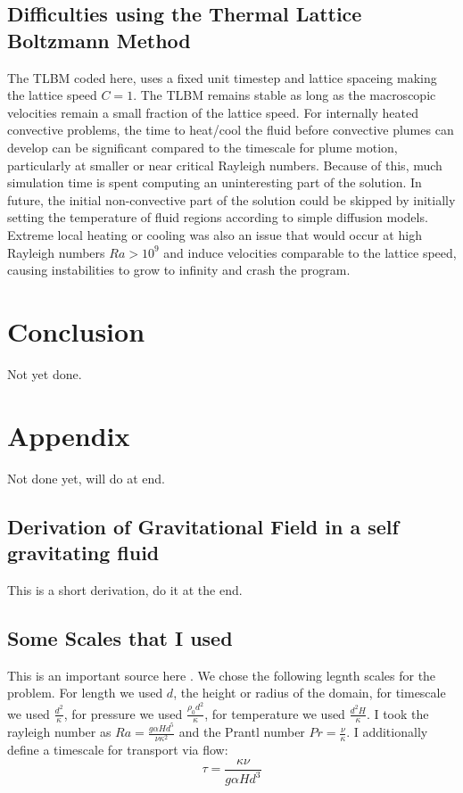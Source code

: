 \documentclass{article}
\begin{document}
\subsection*{Difficulties using the Thermal Lattice Boltzmann Method}
The TLBM coded here, uses a fixed unit timestep and lattice spaceing making the lattice speed $C=1$. The TLBM remains stable as long as the macroscopic velocities remain a small fraction of the lattice speed. For internally heated convective problems, the time to heat/cool the fluid before convective plumes can develop can be significant compared to the timescale for plume motion, particularly at smaller or near critical Rayleigh numbers. Because of this, much simulation time is spent computing an uninteresting part of the solution. In future, the initial non-convective part of the solution could be skipped by initially setting the temperature of fluid regions according to simple diffusion models.
\newline
\noindent Extreme local heating or cooling was also an issue that would occur at high Rayleigh numbers $Ra>10^9$ and induce velocities comparable to the lattice speed, causing instabilities to grow to infinity and crash the program.
\newline



\section*{Conclusion}
Not yet done.


\section*{Appendix}
Not done yet, will do at end.
\subsection*{Derivation of Gravitational Field in a self gravitating fluid}
This is a short derivation, do it at the end. 


\subsection*{Some Scales that I used}
This is an important source here \cite{goluskin2016internally}.
\newline
We chose the following legnth scales for the problem. For length we used $d$, the height or radius of the domain, 
for timescale we used $\frac{d^2}{\kappa}$, for pressure we used $\frac{\rho_0 d^2}{\kappa}$, for temperature we used $\frac{d^2 H}{\kappa}$. 
I took the rayleigh number as $Ra = \frac{g \alpha H d^5}{\nu \kappa^2}$ and the Prantl number $Pr = \frac{\nu}{\kappa}$. I additionally define a timescale for transport via flow:
\begin{equation}
	\tau = \frac{\kappa \nu}{g \alpha H d^3}
\end{equation}






\end{document}
